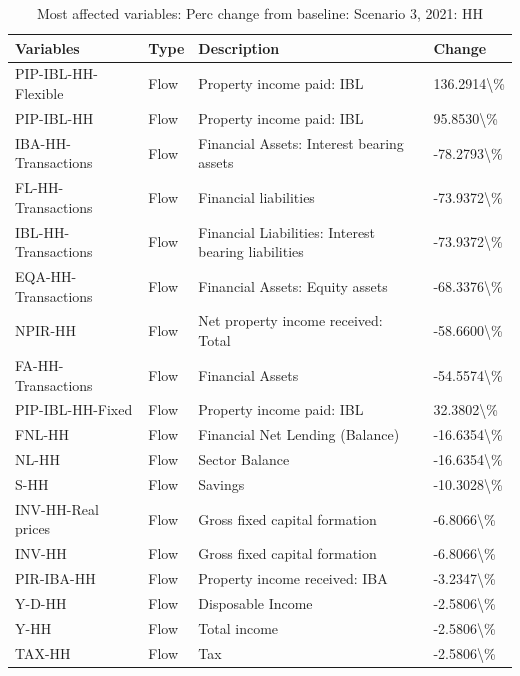 \documentclass[
]{book}
\begin{document}
\begin{table}

\caption{\label{tab:most-affected-Scenario-3-perc-HH}Most affected variables: Perc change from baseline: Scenario 3, 2021: HH}
\centering
\fontsize{10}{12}\selectfont
\begin{tabular}[t]{l|l|l|l}
\hline
Variables & Type & Description & Change\\
\hline
PIP-IBL-HH-Flexible & Flow & Property income paid: IBL & 136.2914\textbackslash{}\%\\
\hline
PIP-IBL-HH & Flow & Property income paid: IBL & 95.8530\textbackslash{}\%\\
\hline
IBA-HH-Transactions & Flow & Financial Assets: Interest bearing assets & -78.2793\textbackslash{}\%\\
\hline
FL-HH-Transactions & Flow & Financial liabilities & -73.9372\textbackslash{}\%\\
\hline
IBL-HH-Transactions & Flow & Financial Liabilities: Interest bearing liabilities & -73.9372\textbackslash{}\%\\
\hline
EQA-HH-Transactions & Flow & Financial Assets: Equity assets & -68.3376\textbackslash{}\%\\
\hline
NPIR-HH & Flow & Net property income received: Total & -58.6600\textbackslash{}\%\\
\hline
FA-HH-Transactions & Flow & Financial Assets & -54.5574\textbackslash{}\%\\
\hline
PIP-IBL-HH-Fixed & Flow & Property income paid: IBL & 32.3802\textbackslash{}\%\\
\hline
FNL-HH & Flow & Financial Net Lending (Balance) & -16.6354\textbackslash{}\%\\
\hline
NL-HH & Flow & Sector Balance & -16.6354\textbackslash{}\%\\
\hline
S-HH & Flow & Savings & -10.3028\textbackslash{}\%\\
\hline
INV-HH-Real prices & Flow & Gross fixed capital formation & -6.8066\textbackslash{}\%\\
\hline
INV-HH & Flow & Gross fixed capital formation & -6.8066\textbackslash{}\%\\
\hline
PIR-IBA-HH & Flow & Property income received: IBA & -3.2347\textbackslash{}\%\\
\hline
Y-D-HH & Flow & Disposable Income & -2.5806\textbackslash{}\%\\
\hline
Y-HH & Flow & Total income & -2.5806\textbackslash{}\%\\
\hline
TAX-HH & Flow & Tax & -2.5806\textbackslash{}\%\\

\end{tabular}
\end{table}
\end{document}
